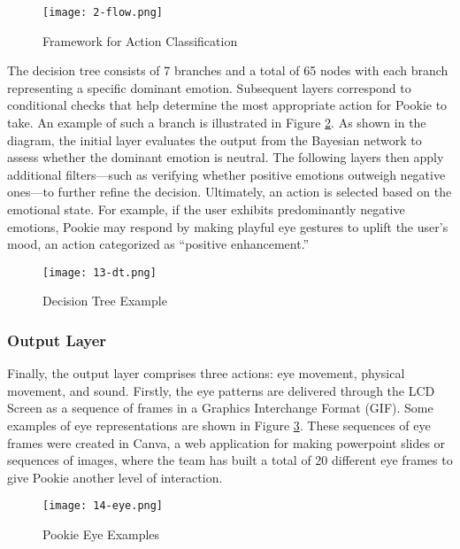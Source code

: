 \begin{figure}[ht]
    \centering
    \texttt{[image: 2-flow.png]}
    \captionsetup{justification=centering}
    \caption{Framework for Action Classification}
    \label{fig:2-framework}
\end{figure}

The decision tree consists of 7 branches and a total of 65 nodes with each branch representing a specific dominant emotion. Subsequent layers correspond to conditional checks that help determine the most appropriate action for Pookie to take. An example of such a branch is illustrated in Figure \ref{fig:13-dt}. As shown in the diagram, the initial layer evaluates the output from the Bayesian network to assess whether the dominant emotion is neutral. The following layers then apply additional filters—such as verifying whether positive emotions outweigh negative ones—to further refine the decision. Ultimately, an action is selected based on the emotional state. For example, if the user exhibits predominantly negative emotions, Pookie may respond by making playful eye gestures to uplift the user's mood, an action categorized as “positive enhancement.”

\begin{figure}[ht]
    \centering
    \texttt{[image: 13-dt.png]}
    \captionsetup{justification=centering}
    \caption{Decision Tree Example}
    \label{fig:13-dt}
\end{figure}

\subsubsection{Output Layer}
Finally, the output layer comprises three actions: eye movement, physical movement, and sound. Firstly, the eye patterns are delivered through the LCD Screen as a sequence of frames in a Graphics Interchange Format (GIF). Some examples of eye representations are shown in Figure \ref{fig:14-eye}. These sequences of eye frames were created in Canva, a web application for making powerpoint slides or sequences of images, where the team has built a total of 20 different eye frames to give Pookie another level of interaction.

\begin{figure}[!ht]
    \centering
    \texttt{[image: 14-eye.png]}
    \captionsetup{justification=centering}
    \caption{Pookie Eye Examples}
    \label{fig:14-eye}
\end{figure}

